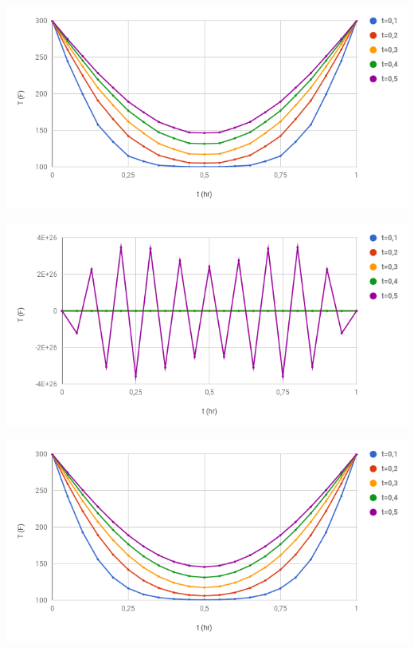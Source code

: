 \documentclass [10 pt, a4 paper]{article}
\begin{document}
\begin{center} 
    \includegraphics[scale=0.5]{Chart/duFortFrankel.PNG}
\end{center}

\begin{center} 
    \includegraphics[scale=0.5]{Chart/richardson.PNG}
\end{center}

\begin{center} 
    \includegraphics[scale=0.5]{Chart/laasonen.PNG}
\end{center}
\end{document}
